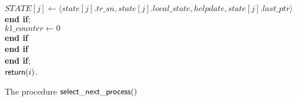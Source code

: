 \begin{figure}[htb]
{{\begin{minipage}[t]{150mm}
\begin{tabbing}
 \>\>\>\>\>\> \>

$\mathit{STATE}[j]\leftarrow 
    \langle state[j].tr\_sn, state[j].local\_state, helpdate, 
                                          state[j].last\_ptr \rangle$ \\

 \>\>\>\>\>\> {\bf end if}; \\

 \>\>\>\>\>\> $k1\_counter \leftarrow 0$\\


 \>\>\>\>\>  {\bf end if}\\

 \>\>\> {\bf end if}\\

  \>   {\bf end if};\\ 

 \>   ${\sf return}(i)$.  %


\end{tabbing}
\normalsize
\end{minipage}
}
\caption{The procedure ${\sf select\_next\_process}()$}
\label{fig:select-next-proc}
}
\end{figure}

